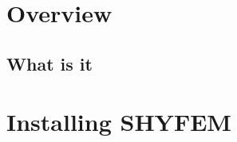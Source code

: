 \documentclass{report}
\newcommand{\todo}[1]{This section still has to be written by #1}
\begin{document}
\newpage










\chapter{Overview}

\section{What is it}








\chapter{Installing SHYFEM}
\end{document}
